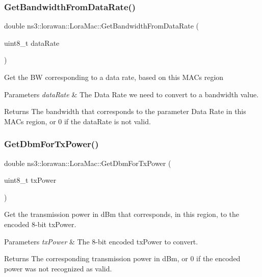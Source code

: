 \subsubsection{\texorpdfstring{Get\+Bandwidth\+From\+Data\+Rate()}{GetBandwidthFromDataRate()}}
{\footnotesize\ttfamily double ns3\+::lorawan\+::\+Lora\+Mac\+::\+Get\+Bandwidth\+From\+Data\+Rate (\begin{DoxyParamCaption}\item[{uint8\+\_\+t}]{data\+Rate }\end{DoxyParamCaption})}

Get the BW corresponding to a data rate, based on this M\+AC\textquotesingle{}s region


\begin{DoxyParams}{Parameters}
{\em data\+Rate} & The Data Rate we need to convert to a bandwidth value. \\
\hline
\end{DoxyParams}
\begin{DoxyReturn}{Returns}
The bandwidth that corresponds to the parameter Data Rate in this M\+AC\textquotesingle{}s region, or 0 if the data\+Rate is not valid. 
\end{DoxyReturn}
\mbox{\label{classns3_1_1lorawan_1_1LoraMac_a9c94b957556a38e2d1eba4a6d95121fe}} 
\subsubsection{\texorpdfstring{Get\+Dbm\+For\+Tx\+Power()}{GetDbmForTxPower()}}
{\footnotesize\ttfamily double ns3\+::lorawan\+::\+Lora\+Mac\+::\+Get\+Dbm\+For\+Tx\+Power (\begin{DoxyParamCaption}\item[{uint8\+\_\+t}]{tx\+Power }\end{DoxyParamCaption})}

Get the transmission power in d\+Bm that corresponds, in this region, to the encoded 8-\/bit tx\+Power.


\begin{DoxyParams}{Parameters}
{\em tx\+Power} & The 8-\/bit encoded tx\+Power to convert.\\
\hline
\end{DoxyParams}
\begin{DoxyReturn}{Returns}
The corresponding transmission power in d\+Bm, or 0 if the encoded power was not recognized as valid. 
\end{DoxyReturn}
\mbox{\label{classns3_1_1lorawan_1_1LoraMac_a1037ae338de4f96866666697ddfc5809}} 
